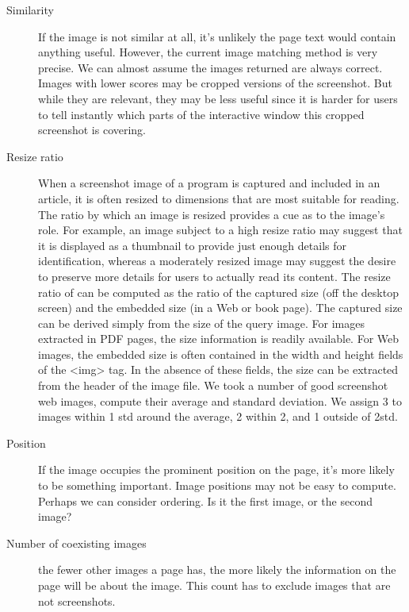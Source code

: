 \documentclass{www2010-submission}
\begin{document}
\begin{description}

\item[Similarity] If the image is not similar at all, it's
unlikely the page text would contain anything useful. However, the
current image matching method is very precise. We can almost
assume the images returned are always correct. Images with lower
scores may be cropped versions of the screenshot. But while they
are relevant, they may be less useful since it is harder for users
to tell instantly which parts of the interactive window this
cropped screenshot is covering.

\item[Resize ratio]

When a screenshot image of a program is captured and included in
an article, it is often resized to dimensions that are most
suitable for reading. The ratio by which an image is resized
provides a cue as to the image's role. For example, an image
subject to a high resize ratio may suggest that it is displayed as
a thumbnail to provide just enough details for identification,
whereas a moderately resized image may suggest the desire to
preserve more details for users to actually read its content. The
resize ratio of can be computed as the ratio of the captured size
(off the desktop screen) and the embedded size (in a Web or book
page). The captured size can be derived simply from the size of
the query image. For images extracted in PDF pages, the size
information is readily available. For Web images, the embedded
size is often contained in the width and height fields of the
<img> tag. In the absence of these fields, the size can be
extracted from the header of the image file. We took a number of
good screenshot web images, compute their average and standard
deviation. We assign 3 to images within 1 std around the average,
2 within 2, and 1 outside of 2std.


\item[Position]

If the image occupies the prominent position on the page, it's
more likely to be something important. Image positions may not be
easy to compute. Perhaps we can consider ordering. Is it the first
image, or the second image?

\item[Number of coexisting images] the fewer other images
a page has, the more likely the information on the page will be
about the image. This count has to exclude images that are not
screenshots.

\end{description}
\end{document}

